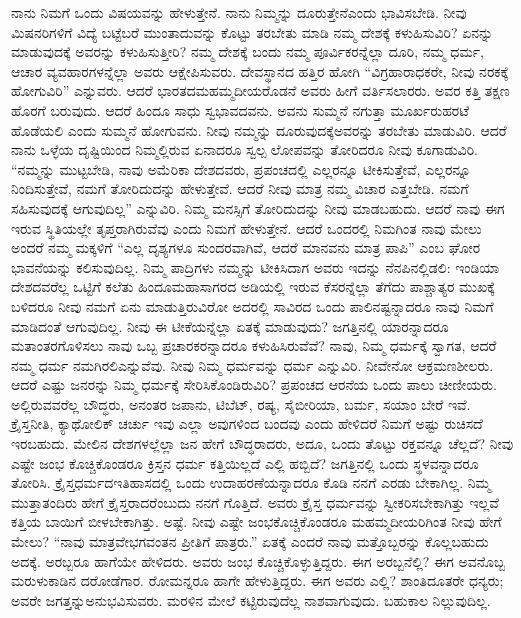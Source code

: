 ನಾನು ನಿಮಗೆ ಒಂದು ವಿಷಯವನ್ನು ಹೇಳುತ್ತೇನೆ. ನಾನು ನಿಮ್ಮನ್ನು ದೂರುತ್ತೇನೆ\break ಎಂದು ಭಾವಿಸಬೇಡಿ. ನೀವು ಮಿಷನರಿಗಳಿಗೆ ವಿದ್ಯೆ ಬಟ್ಟೆಬರೆ ಮುಂತಾದುವನ್ನು ಕೊಟ್ಟು ತರಬೇತು ಮಾಡಿ ನಮ್ಮ ದೇಶಕ್ಕೆ ಕಳುಹಿಸುವಿರಿ? ಏನನ್ನು ಮಾಡುವುದಕ್ಕೆ ಅವರನ್ನು ಕಳುಹಿಸುತ್ತೀರಿ? ನಮ್ಮ ದೇಶಕ್ಕೆ ಬಂದು ನಮ್ಮ ಪೂರ್ವಿಕರನ್ನೆಲ್ಲಾ ದೂರಿ, ನಮ್ಮ ಧರ್ಮ, ಆಚಾರ ವ್ಯವಹಾರಗಳನ್ನೆಲ್ಲಾ ಅವರು ಆಕ್ಷೇಪಿಸುವರು. ದೇವಸ್ಥಾನದ ಹತ್ತಿರ ಹೋಗಿ “ವಿಗ್ರಹಾರಾಧಕರೇ, ನೀವು ನರಕಕ್ಕೆ ಹೋಗುವಿರಿ” ಎನ್ನುವರು. ಆದರೆ ಭಾರತದ\break ಮಹಮ್ಮದೀಯರೊಡನೆ ಅವರು ಹೀಗೆ ವರ್ತಿಸಲಾರರು. ಅವರ ಕತ್ತಿ ತಕ್ಷಣ ಹೊರಗೆ ಬರುವುದು. ಆದರೆ ಹಿಂದೂ ಸಾಧು ಸ್ವಭಾವದವನು. ಅವನು ಸುಮ್ಮನೆ ನಗುತ್ತಾ ಮೂರ್ಖರು\break ಹರಟೆ ಹೊಡೆಯಲಿ ಎಂದು ಸುಮ್ಮನೆ ಹೋಗುವನು. ನೀವು ನಮ್ಮನ್ನು ದೂರುವುದಕ್ಕೆ\break ಅವರನ್ನು ತರಬೇತು ಮಾಡುವಿರಿ. ಆದರೆ ನಾನು ಒಳ್ಳೆಯ ದೃಷ್ಟಿಯಿಂದ ನಿಮ್ಮಲ್ಲಿರುವ ಏನಾದರೂ ಸ್ವಲ್ಪ ಲೋಪವನ್ನು ತೋರಿದರೂ ನೀವು ಕೂಗಾಡುವಿರಿ. “ನಮ್ಮನ್ನು ಮುಟ್ಟಬೇಡಿ, ನಾವು ಅಮೆರಿಕಾ ದೇಶದವರು, ಪ್ರಪಂಚದಲ್ಲಿ ಎಲ್ಲರನ್ನೂ ಟೀಕಿಸುತ್ತೇವೆ, ಎಲ್ಲರನ್ನೂ ನಿಂದಿಸುತ್ತೇವೆ, ನಮಗೆ ತೋರಿದುದನ್ನು ಹೇಳುತ್ತೇವೆ. ಆದರೆ ನೀವು ಮಾತ್ರ ನಮ್ಮ ವಿಚಾರ ಎತ್ತಬೇಡಿ. ನಮಗೆ ಸಹಿಸುವುದಕ್ಕೆ ಆಗುವುದಿಲ್ಲ” ಎನ್ನುವಿರಿ. ನಿಮ್ಮ ಮನಸ್ಸಿಗೆ ತೋರಿದುದನ್ನು ನೀವು ಮಾಡಬಹುದು. ಆದರೆ ನಾವು ಈಗ ಇರುವ ಸ್ಥಿತಿಯಲ್ಲೇ ತೃಪ್ತರಾಗಿರುವೆವು ಎಂದು ನಿಮಗೆ ಹೇಳುತ್ತೇನೆ. ಆದರೆ ಒಂದರಲ್ಲಿ ನಿಮಗಿಂತ ನಾವು ಮೇಲು ಅಂದರೆ ನಮ್ಮ ಮಕ್ಕಳಿಗೆ “ಎಲ್ಲ ದೃಶ್ಯಗಳೂ ಸುಂದರವಾಗಿವೆ, ಆದರೆ ಮಾನವನು ಮಾತ್ರ ಪಾಪಿ” ಎಂಬ ಘೋರ ಭಾವನೆಯನ್ನು ಕಲಿಸುವುದಿಲ್ಲ. ನಿಮ್ಮ ಪಾದ್ರಿಗಳು ನಮ್ಮನ್ನು ಟೀಕಿಸಿದಾಗ ಅವರು ಇದನ್ನು ನೆನಪಿನಲ್ಲಿಡಲಿ: ಇಂಡಿಯಾ ದೇಶದವರೆಲ್ಲ ಒಟ್ಟಿಗೆ ಕಲೆತು ಹಿಂದೂಮಹಾಸಾಗರದ ಅಡಿಯಲ್ಲಿ ಇರುವ ಕೆಸರನ್ನೆಲ್ಲಾ ತೆಗೆದು ಪಾಶ್ಚಾತ್ಯರ ಮುಖಕ್ಕೆ ಬಳಿದರೂ ನೀವು ನಮಗೆ ಏನು ಮಾಡುತ್ತಿರುವಿರೋ ಅದರಲ್ಲಿ ಸಾವಿರದ ಒಂದು ಪಾಲಿನಷ್ಟನ್ನಾದರೂ ನಾವು ನಿಮಗೆ ಮಾಡಿದಂತೆ ಆಗುವುದಿಲ್ಲ. ನೀವು ಈ ಟೀಕೆಯನ್ನೆಲ್ಲಾ ಏತಕ್ಕೆ ಮಾಡುವುದು? ಜಗತ್ತಿನಲ್ಲಿ ಯಾರನ್ನಾದರೂ ಮತಾಂತರಗೊಳಿಸಲು ನಾವು ಒಬ್ಬ ಪ್ರಚಾರಕರನ್ನಾ\-ದರೂ ಕಳುಹಿಸಿರುವೆವೆ? ನಾವು, ನಿಮ್ಮ ಧರ್ಮಕ್ಕೆ ಸ್ವಾಗತ, ಆದರೆ ನಮ್ಮ ಧರ್ಮ ನಮಗಿರಲಿ\break ಎನ್ನುವೆವು. ನೀವು ನಿಮ್ಮ ಧರ್ಮವನ್ನು ಧರ್ಮ ಎನ್ನುವಿರಿ. ನೀವೇನೋ ಆಕ್ರಮಣಶೀಲರು. ಆದರೆ ಎಷ್ಟು ಜನರನ್ನು ನಿಮ್ಮ ಧರ್ಮಕ್ಕೆ ಸೇರಿಸಿಕೊಂಡಿರುವಿರಿ? ಪ್ರಪಂಚದ ಆರನೆಯ ಒಂದು ಪಾಲು ಚೀಣೀಯರು. ಅಲ್ಲಿರುವವರೆಲ್ಲ ಬೌದ್ಧರು, ಅನಂತರ ಜಪಾನು, ಟಿಬೆಟ್​, ರಷ್ಯ, ಸೈಬೀರಿಯಾ, ಬರ್ಮ, ಸಯಾಂ ಬೇರೆ ಇವೆ. ಕ್ರೈಸ್ತನೀತಿ, ಕ್ಯಾಥೋಲಿಕ್​ ಚರ್ಚು ಇವು ಎಲ್ಲಾ ಅವುಗಳಿಂದ ಬಂದವು ಎಂದು ಹೇಳಿದರೆ ನಿಮಗೆ ಅಷ್ಟು ರುಚಿಸದೆ ಇರಬಹುದು. ಮೇಲಿನ ದೇಶಗಳಲ್ಲೆಲ್ಲಾ ಜನ ಹೇಗೆ ಬೌದ್ಧರಾದರು, ಅದೂ, ಒಂದು ತೊಟ್ಟು ರಕ್ತವನ್ನೂ ಚೆಲ್ಲದೆ? ನೀವು ಎಷ್ಟೇ ಜಂಭ ಕೊಚ್ಚಿಕೊಂಡರೂ ಕ್ರಿಸ್ತನ ಧರ್ಮ ಕತ್ತಿ\-ಯಿಲ್ಲದೆ ಎಲ್ಲಿ ಹಬ್ಬಿದೆ? ಜಗತ್ತಿನಲ್ಲಿ ಒಂದು ಸ್ಥಳವನ್ನಾದರೂ ತೋರಿಸಿ. ಕ್ರೈಸ್ತಧರ್ಮದ\break ಇತಿಹಾಸದಲ್ಲಿ ಒಂದು ಉದಾಹರಣೆಯನ್ನಾದರೂ ಕೊಡಿ ನನಗೆ ಎರಡು ಬೇಕಾಗಿಲ್ಲ. ನಿಮ್ಮ ಮುತ್ತಾತಂದಿರು ಹೇಗೆ ಕ್ರೈಸ್ತರಾದರೆಂಬುದು ನನಗೆ ಗೊತ್ತಿದೆ. ಅವರು ಕ್ರೈಸ್ತ ಧರ್ಮವನ್ನು ಸ್ವೀಕರಿಸಬೇಕಾಗಿತ್ತು ಇಲ್ಲವೆ ಕತ್ತಿಯ ಬಾಯಿಗೆ ಬೀಳಬೇಕಾಗಿತ್ತು. ಅಷ್ಟೆ. ನೀವು ಎಷ್ಟೇ ಜಂಭ\break ಕೊಚ್ಚಿಕೊಂಡರೂ ಮಹಮ್ಮದೀಯರಿಗಿಂತ ನೀವು ಹೇಗೆ ಮೇಲು? “ನಾವು ಮಾತ್ರವೇ\break ಭಗವಂತನ ಪ್ರೀತಿಗೆ ಪಾತ್ರರು.” ಏತಕ್ಕೆ ಎಂದರೆ ನಾವು ಮತ್ತೊಬ್ಬರನ್ನು ಕೊಲ್ಲಬಹುದು ಅದಕ್ಕೆ. ಅರಬ್ಬರೂ ಹಾಗೆಯೇ ಹೇಳಿದರು. ಅವರು ಜಂಭ ಕೊಚ್ಚಿಕೊಳ್ಳುತ್ತಿದ್ದರು. ಈಗ ಅರಬ್ಬನೆಲ್ಲಿ? ಈಗ ಅವನೊಬ್ಬ ಮರುಳುಕಾಡಿನ ದರೋಡೆಗಾರ. ರೋಮನ್ನರೂ ಹಾಗೇ ಹೇಳುತ್ತಿದ್ದರು. ಈಗ ಅವರು ಎಲ್ಲಿ? ಶಾಂತಿದೂತರೇ ಧನ್ಯರು; ಅವರೇ ಜಗತ್ತನ್ನು\break ಅನುಭವಿಸುವರು. ಮರಳಿನ ಮೇಲೆ ಕಟ್ಟಿರುವುದೆಲ್ಲ ನಾಶವಾಗುವುದು. ಬಹುಕಾಲ ನಿಲ್ಲುವುದಿಲ್ಲ.


